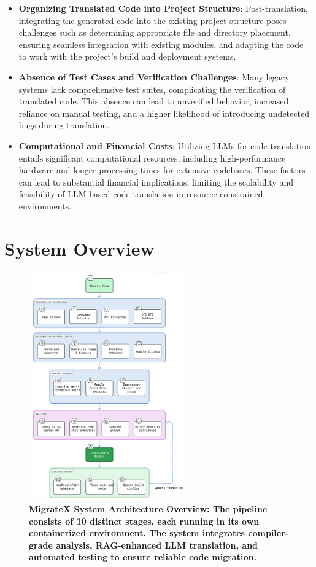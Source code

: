 \documentclass[twocolumn]{article}
\begin{document}
\begin{itemize}
  \item \textbf{Organizing Translated Code into Project Structure}: Post-translation, integrating the generated code into the existing project structure poses challenges such as determining appropriate file and directory placement, ensuring seamless integration with existing modules, and adapting the code to work with the project's build and deployment systems.

  \item \textbf{Absence of Test Cases and Verification Challenges}: Many legacy systems lack comprehensive test suites, complicating the verification of translated code. This absence can lead to unverified behavior, increased reliance on manual testing, and a higher likelihood of introducing undetected bugs during translation.

  \item \textbf{Computational and Financial Costs}: Utilizing LLMs for code translation entails significant computational resources, including high-performance hardware and longer processing times for extensive codebases. These factors can lead to substantial financial implications, limiting the scalability and feasibility of LLM-based code translation in resource-constrained environments.
\end{itemize}

\section{System Overview}

\begin{figure}[t]
    \centering
    \includegraphics[width=0.6\textwidth]{figures/system_overview_1.png}
    \caption{\textbf{MigrateX System Architecture Overview: The pipeline consists of 10 distinct stages, each running in its own containerized environment. The system integrates compiler-grade analysis, RAG-enhanced LLM translation, and automated testing to ensure reliable code migration.}}
    \label{fig:system-overview}
\end{figure}
\end{document}
